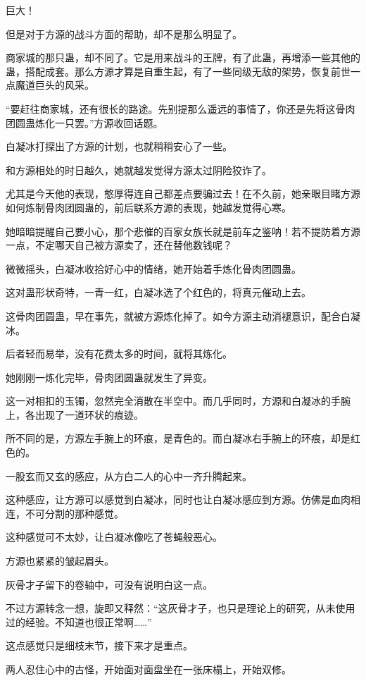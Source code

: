 \begin{this_body}
巨大！

但是对于方源的战斗方面的帮助，却不是那么明显了。

商家城的那只蛊，却不同了。它是用来战斗的王牌，有了此蛊，再增添一些其他的蛊，搭配成套。那么方源才算是自重生起，有了一些同级无敌的架势，恢复前世一点魔道巨头的风采。

“要赶往商家城，还有很长的路途。先别提那么遥远的事情了，你还是先将这骨肉团圆蛊炼化一只罢。”方源收回话题。

白凝冰打探出了方源的计划，也就稍稍安心了一些。

和方源相处的时日越久，她就越发觉得方源太过阴险狡诈了。

尤其是今天他的表现，憨厚得连自己都差点要骗过去！在不久前，她亲眼目睹方源如何炼制骨肉团圆蛊的，前后联系方源的表现，她越发觉得心寒。

她暗暗提醒自己要小心，那个悲催的百家女族长就是前车之鉴呐！若不提防着方源一点，不定哪天自己被方源卖了，还在替他数钱呢？

微微摇头，白凝冰收拾好心中的情绪，她开始着手炼化骨肉团圆蛊。

这对蛊形状奇特，一青一红，白凝冰选了个红色的，将真元催动上去。

这骨肉团圆蛊，早在事先，就被方源炼化掉了。如今方源主动消褪意识，配合白凝冰。

后者轻而易举，没有花费太多的时间，就将其炼化。

她刚刚一炼化完毕，骨肉团圆蛊就发生了异变。

这一对相扣的玉镯，忽然完全消散在半空中。而几乎同时，方源和白凝冰的手腕上，各出现了一道环状的痕迹。

所不同的是，方源左手腕上的环痕，是青色的。而白凝冰右手腕上的环痕，却是红色的。

一股玄而又玄的感应，从方白二人的心中一齐升腾起来。

这种感应，让方源可以感觉到白凝冰，同时也让白凝冰感应到方源。仿佛是血肉相连，不可分割的那种感觉。

这种感觉可不太妙，让白凝冰像吃了苍蝇般恶心。

方源也紧紧的皱起眉头。

灰骨才子留下的卷轴中，可没有说明白这一点。

不过方源转念一想，旋即又释然：“这灰骨才子，也只是理论上的研究，从未使用过的经验。不知道也很正常啊……”

这点感觉只是细枝末节，接下来才是重点。

两人忍住心中的古怪，开始面对面盘坐在一张床榻上，开始双修。


\end{this_body}
